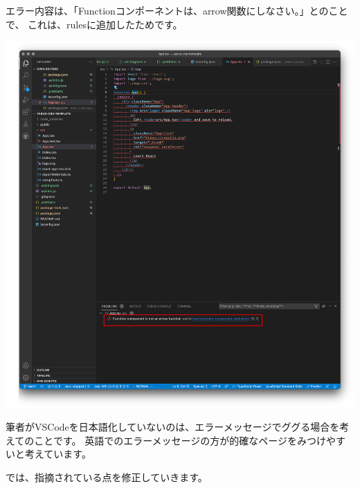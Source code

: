\vspace*{\baselineskip}

エラー内容は、「Functionコンポーネントは、arrow関数にしなさい。」とのことで、
これは、rulesに追加したためです。

\begin{reviewimage}%
\includegraphics[width=0.8\maxwidth]{./images/02-create-react-app/cra-fix_app_tsx.png}%
\label{image:02-create-react-app:cra-fix_app_tsx}
\end{reviewimage}
\begin{starternote}[]{}

筆者がVSCodeを日本語化していないのは、エラーメッセージでググる場合を考えてのことです。
英語でのエラーメッセージの方が的確なページをみつけやすいと考えています。

\end{starternote}

では、指摘されている点を修正していきます。


